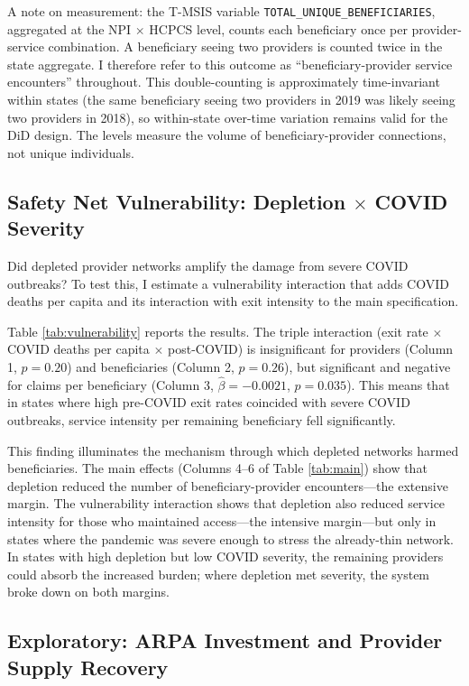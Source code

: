\documentclass[12pt]{article}
\begin{document}
A note on measurement: the T-MSIS variable \texttt{TOTAL\_UNIQUE\_BENEFICIARIES}, aggregated at the NPI $\times$ HCPCS level, counts each beneficiary once per provider-service combination. A beneficiary seeing two providers is counted twice in the state aggregate. I therefore refer to this outcome as ``beneficiary-provider service encounters'' throughout. This double-counting is approximately time-invariant within states (the same beneficiary seeing two providers in 2019 was likely seeing two providers in 2018), so within-state over-time variation remains valid for the DiD design. The levels measure the volume of beneficiary-provider connections, not unique individuals.

\subsection{Safety Net Vulnerability: Depletion $\times$ COVID Severity}

Did depleted provider networks amplify the damage from severe COVID outbreaks? To test this, I estimate a vulnerability interaction that adds COVID deaths per capita and its interaction with exit intensity to the main specification.



Table \ref{tab:vulnerability} reports the results. The triple interaction (exit rate $\times$ COVID deaths per capita $\times$ post-COVID) is insignificant for providers (Column 1, $p = 0.20$) and beneficiaries (Column 2, $p = 0.26$), but significant and negative for claims per beneficiary (Column 3, $\hat{\beta} = -0.0021$, $p = 0.035$). This means that in states where high pre-COVID exit rates coincided with severe COVID outbreaks, service intensity per remaining beneficiary fell significantly.

This finding illuminates the mechanism through which depleted networks harmed beneficiaries. The main effects (Columns 4--6 of Table \ref{tab:main}) show that depletion reduced the number of beneficiary-provider encounters---the extensive margin. The vulnerability interaction shows that depletion also reduced service intensity for those who maintained access---the intensive margin---but only in states where the pandemic was severe enough to stress the already-thin network. In states with high depletion but low COVID severity, the remaining providers could absorb the increased burden; where depletion met severity, the system broke down on both margins.

\subsection{Exploratory: ARPA Investment and Provider Supply Recovery}
\end{document}
